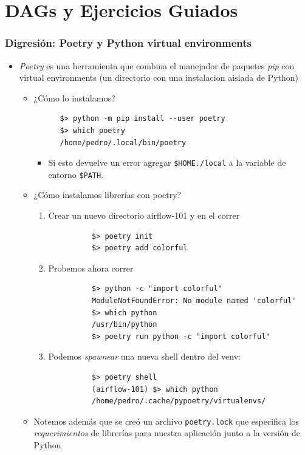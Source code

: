\documentclass[leqno, 10pt, envcountsect]{beamer}
\numberwithin{equation}{section}
\theoremstyle{definition}
\theoremstyle{example}
\numberwithin{figure}{section}
\numberwithin{table}{section}
\let\olditem\item
\renewcommand{\item}{%
\olditem\vspace{1pt}}
\begin{document}
\section{DAGs y Ejercicios Guiados}
\label{sec:primeros_dags}


\begin{frame}[fragile=singleslide]
  \frametitle{Digresión: Poetry y Python virtual environments}
  \begin{itemize}
    \item \textit{Poetry} es una herramienta que combina el manejador de
      paquetes \textit{pip} con virtual environments (un directorio con una
      instalacion aislada de Python)
    \begin{itemize}
      \item ¿Cómo lo instalamos?
      \begin{verbatim}
      $> python -m pip install --user poetry
      $> which poetry
      /home/pedro/.local/bin/poetry
      \end{verbatim}
      \begin{itemize}
        \item Si esto devuelve un error agregar \texttt{\$HOME./local} a la
          variable de entorno \texttt{\$PATH}.
      \end{itemize}
      \item ¿Cómo instalamos librerías con poetry?
        \begin{enumerate}
          \item Crear un nuevo directorio airflow-101 y en el correr
          \begin{verbatim}
          $> poetry init
          $> poetry add colorful
          \end{verbatim}
        \item Probemos ahora correr
          \begin{verbatim}
          $> python -c "import colorful"
          ModuleNotFoundError: No module named 'colorful'
          $> which python
          /usr/bin/python
          $> poetry run python -c "import colorful"
          \end{verbatim}
        \item Podemos \textit{spawnear} una nueva shell dentro del venv:
          \begin{verbatim}
          $> poetry shell
          (airflow-101) $> which python
          /home/pedro/.cache/pypoetry/virtualenvs/
          \end{verbatim}
        \end{enumerate}
    \item Notemos además que se creó un archivo \texttt{poetry.lock} que
      especifica los \textit{requerimientos} de librerías para nuestra
        aplicación junto a la versión de Python
    \end{itemize}
  \end{itemize}
\end{frame}
\end{document}

